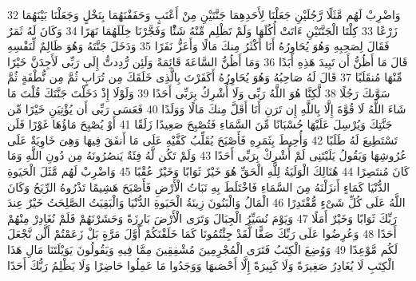 \documentclass[20pt,a4paper]{article}
\begin{document}
{\tiny\colorbox{cl_aya}{32}} وَاضْرِبْ لَهُم مَّثَلًا رَّجُلَيْنِ جَعَلْنَا لِأَحَدِهِمَا جَنَّتَيْنِ مِنْ أَعْنَبٍ وَحَفَفْنَهُمَا بِنَخْلٍ وَجَعَلْنَا بَيْنَهُمَا زَرْعًا
{\tiny\colorbox{cl_aya}{33}} كِلْتَا الْجَنَّتَيْنِ ءَاتَتْ أُكُلَهَا وَلَمْ تَظْلِم مِّنْهُ شَئًْا وَفَجَّرْنَا خِلَلَهُمَا نَهَرًا
{\tiny\colorbox{cl_aya}{34}} وَكَانَ لَهُ ثَمَرٌ فَقَالَ لِصَحِبِهِ وَهُوَ يُحَاوِرُهُ أَنَا أَكْثَرُ مِنكَ مَالًا وَأَعَزُّ نَفَرًا
{\tiny\colorbox{cl_aya}{35}} وَدَخَلَ جَنَّتَهُ وَهُوَ ظَالِمٌ لِّنَفْسِهِ قَالَ مَا أَظُنُّ أَن تَبِيدَ هَذِهِ أَبَدًا
{\tiny\colorbox{cl_aya}{36}} وَمَا أَظُنُّ السَّاعَةَ قَائِمَةً وَلَئِن رُّدِدتُّ إِلَى رَبِّى لَأَجِدَنَّ خَيْرًا مِّنْهَا مُنقَلَبًا
{\tiny\colorbox{cl_aya}{37}} قَالَ لَهُ صَاحِبُهُ وَهُوَ يُحَاوِرُهُ أَكَفَرْتَ بِالَّذِى خَلَقَكَ مِن تُرَابٍ ثُمَّ مِن نُّطْفَةٍ ثُمَّ سَوَّىكَ رَجُلًا
{\tiny\colorbox{cl_aya}{38}} لَّكِنَّا هُوَ اللَّهُ رَبِّى وَلَا أُشْرِكُ بِرَبِّى أَحَدًا
{\tiny\colorbox{cl_aya}{39}} وَلَوْلَا إِذْ دَخَلْتَ جَنَّتَكَ قُلْتَ مَا شَاءَ اللَّهُ لَا قُوَّةَ إِلَّا بِاللَّهِ إِن تَرَنِ أَنَا أَقَلَّ مِنكَ مَالًا وَوَلَدًا
{\tiny\colorbox{cl_aya}{40}} فَعَسَى رَبِّى أَن يُؤْتِيَنِ خَيْرًا مِّن جَنَّتِكَ وَيُرْسِلَ عَلَيْهَا حُسْبَانًا مِّنَ السَّمَاءِ فَتُصْبِحَ صَعِيدًا زَلَقًا
{\tiny\colorbox{cl_aya}{41}} أَوْ يُصْبِحَ مَاؤُهَا غَوْرًا فَلَن تَسْتَطِيعَ لَهُ طَلَبًا
{\tiny\colorbox{cl_aya}{42}} وَأُحِيطَ بِثَمَرِهِ فَأَصْبَحَ يُقَلِّبُ كَفَّيْهِ عَلَى مَا أَنفَقَ فِيهَا وَهِىَ خَاوِيَةٌ عَلَى عُرُوشِهَا وَيَقُولُ يَلَيْتَنِى لَمْ أُشْرِكْ بِرَبِّى أَحَدًا
{\tiny\colorbox{cl_aya}{43}} وَلَمْ تَكُن لَّهُ فِئَةٌ يَنصُرُونَهُ مِن دُونِ اللَّهِ وَمَا كَانَ مُنتَصِرًا
{\tiny\colorbox{cl_aya}{44}} هُنَالِكَ الْوَلَيَةُ لِلَّهِ الْحَقِّ هُوَ خَيْرٌ ثَوَابًا وَخَيْرٌ عُقْبًا
{\tiny\colorbox{cl_aya}{45}} وَاضْرِبْ لَهُم مَّثَلَ الْحَيَوةِ الدُّنْيَا كَمَاءٍ أَنزَلْنَهُ مِنَ السَّمَاءِ فَاخْتَلَطَ بِهِ نَبَاتُ الْأَرْضِ فَأَصْبَحَ هَشِيمًا تَذْرُوهُ الرِّيَحُ وَكَانَ اللَّهُ عَلَى كُلِّ شَىْءٍ مُّقْتَدِرًا
{\tiny\colorbox{cl_aya}{46}} الْمَالُ وَالْبَنُونَ زِينَةُ الْحَيَوةِ الدُّنْيَا وَالْبَقِيَتُ الصَّلِحَتُ خَيْرٌ عِندَ رَبِّكَ ثَوَابًا وَخَيْرٌ أَمَلًا
{\tiny\colorbox{cl_aya}{47}} وَيَوْمَ نُسَيِّرُ الْجِبَالَ وَتَرَى الْأَرْضَ بَارِزَةً وَحَشَرْنَهُمْ فَلَمْ نُغَادِرْ مِنْهُمْ أَحَدًا
{\tiny\colorbox{cl_aya}{48}} وَعُرِضُوا عَلَى رَبِّكَ صَفًّا لَّقَدْ جِئْتُمُونَا كَمَا خَلَقْنَكُمْ أَوَّلَ مَرَّةٍ بَلْ زَعَمْتُمْ أَلَّن نَّجْعَلَ لَكُم مَّوْعِدًا
{\tiny\colorbox{cl_aya}{49}} وَوُضِعَ الْكِتَبُ فَتَرَى الْمُجْرِمِينَ مُشْفِقِينَ مِمَّا فِيهِ وَيَقُولُونَ يَوَيْلَتَنَا مَالِ هَذَا الْكِتَبِ لَا يُغَادِرُ صَغِيرَةً وَلَا كَبِيرَةً إِلَّا أَحْصَىهَا وَوَجَدُوا مَا عَمِلُوا حَاضِرًا وَلَا يَظْلِمُ رَبُّكَ أَحَدًا
\end{document}
